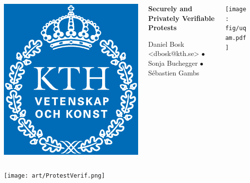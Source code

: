 \begin{columns}
  \begin{column}{0.17\linewidth}
    \includegraphics[width=0.5\linewidth]{fig/kth_cmyk.eps}
    \hfill
  \end{column}
  \hfill
  \begin{column}{0.64\linewidth}
    \begin{center}
      \Huge\bfseries
      Securely and Privately Verifiable Protests
    \end{center}
    \begin{center}
      \large
      Daniel Bosk <dbosk@kth.se>
      $\bullet$
      Sonja Buchegger
      $\bullet$
      Sébastien Gambs
    \end{center}
    \vspace{1.5em}
  \end{column}
  \hfill
  \begin{column}{0.17\linewidth}
    \hfill
    \texttt{[image: fig/uqam.pdf]}
  \end{column}
\end{columns}

\vfill

\texttt{[image: art/ProtestVerif.png]}

\vfill

